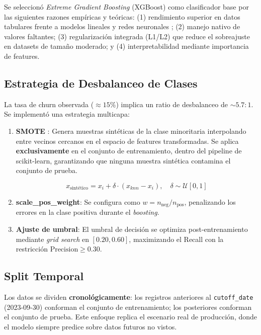 \documentclass[12pt, letterpaper]{article}
\begin{document}
Se seleccionó \textit{Extreme Gradient Boosting} (XGBoost) como clasificador
base por las siguientes razones empíricas y teóricas: (1) rendimiento
superior en datos tabulares frente a modelos lineales y redes neuronales
\citep{chen2016xgboost}; (2) manejo nativo de valores faltantes; (3)
regularización integrada (L1/L2) que reduce el sobreajuste en datasets
de tamaño moderado; y (4) interpretabilidad mediante importancia de features.

\subsection{Estrategia de Desbalanceo de Clases}

La tasa de churn observada ($\approx 15\%$) implica un ratio de desbalanceo
de $\sim 5.7:1$. Se implementó una estrategia multicapa:

\begin{enumerate}
  \item \textbf{SMOTE} \citep{chawla2002smote}: Genera muestras sintéticas de
  la clase minoritaria interpolando entre vecinos cercanos en el espacio
  de features transformadas. Se aplica \textbf{exclusivamente} en el conjunto
  de entrenamiento, dentro del pipeline de scikit-learn, garantizando que
  ninguna muestra sintética contamina el conjunto de prueba.

  \begin{equation}
  x_{\text{sintético}} = x_i + \delta \cdot (x_{knn} - x_i), \quad \delta \sim \mathcal{U}[0,1]
  \label{eq:smote}
  \end{equation}

  \item \textbf{scale\_pos\_weight}: Se configura como $w = n_{\text{neg}} / n_{\text{pos}}$,
  penalizando los errores en la clase positiva durante el \textit{boosting}.

  \item \textbf{Ajuste de umbral}: El umbral de decisión se optimiza
  post-entrenamiento mediante \textit{grid search} en $[0.20, 0.60]$,
  maximizando el Recall con la restricción $\text{Precision} \geq 0.30$.
\end{enumerate}

\subsection{Split Temporal}

\begin{tcolorbox}[colback=blue!5, colframe=blue!50, title={Split Temporal — Prevención de Leakage}]
Los datos se dividen \textbf{cronológicamente}: los registros anteriores al
\texttt{cutoff\_date} (2023-09-30) conforman el conjunto de entrenamiento; los
posteriores conforman el conjunto de prueba. Este enfoque replica el escenario
real de producción, donde el modelo siempre predice sobre datos futuros no vistos.
\end{tcolorbox}
\end{document}
